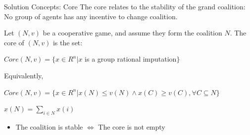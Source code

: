 \documentclass{beamer}
\begin{document}
\begin{frame} {Solution Concepts: Core}
    The core relates to the stability of the grand coalition: \\ No group of agents has any incentive to change coalition.
    \begin{definition}\label{dfn:core}
        Let $(N,v)$ be a cooperative game, and assume they form the coalition $N$. The core of $(N,v)$ is the set:
        \vspace{0.1cm}
        \begin{center}
            $Core(N,v) = \{x \in R^n | x$ is a group rational imputation$\}$
        \end{center}
        Equivalently,
        \vspace{0.1cm}
        \begin{center}
            $Core(N,v) = \{x \in R^n | x(N) \leq v(N) \wedge x(C) \geq v(C), \forall C \subseteq N\}$ \\
        \end{center}
        \small{$x(N) = \sum_{i \in N} x(i)$}
    \end{definition}

    \begin{itemize}
       \item The coalition is stable $\Leftrightarrow$ The core is not empty
    \end{itemize}

\end{frame}
%
%
%
%
\end{document}
